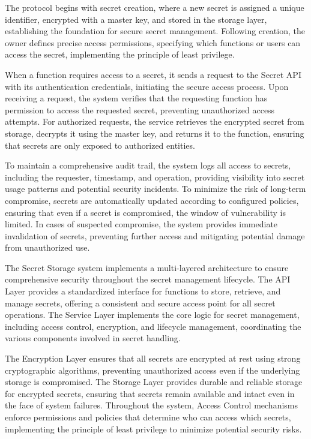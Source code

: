 \documentclass[12pt,a4paper]{article}
\begin{document}


The protocol begins with secret creation, where a new secret is assigned a unique identifier, encrypted with a master key, and stored in the storage layer, establishing the foundation for secure secret management. Following creation, the owner defines precise access permissions, specifying which functions or users can access the secret, implementing the principle of least privilege.

When a function requires access to a secret, it sends a request to the Secret API with its authentication credentials, initiating the secure access process. Upon receiving a request, the system verifies that the requesting function has permission to access the requested secret, preventing unauthorized access attempts. For authorized requests, the service retrieves the encrypted secret from storage, decrypts it using the master key, and returns it to the function, ensuring that secrets are only exposed to authorized entities.

To maintain a comprehensive audit trail, the system logs all access to secrets, including the requester, timestamp, and operation, providing visibility into secret usage patterns and potential security incidents. To minimize the risk of long-term compromise, secrets are automatically updated according to configured policies, ensuring that even if a secret is compromised, the window of vulnerability is limited. In cases of suspected compromise, the system provides immediate invalidation of secrets, preventing further access and mitigating potential damage from unauthorized use.

The Secret Storage system implements a multi-layered architecture to ensure comprehensive security throughout the secret management lifecycle. The API Layer provides a standardized interface for functions to store, retrieve, and manage secrets, offering a consistent and secure access point for all secret operations. The Service Layer implements the core logic for secret management, including access control, encryption, and lifecycle management, coordinating the various components involved in secret handling.

The Encryption Layer ensures that all secrets are encrypted at rest using strong cryptographic algorithms, preventing unauthorized access even if the underlying storage is compromised. The Storage Layer provides durable and reliable storage for encrypted secrets, ensuring that secrets remain available and intact even in the face of system failures. Throughout the system, Access Control mechanisms enforce permissions and policies that determine who can access which secrets, implementing the principle of least privilege to minimize potential security risks.
\end{document}
